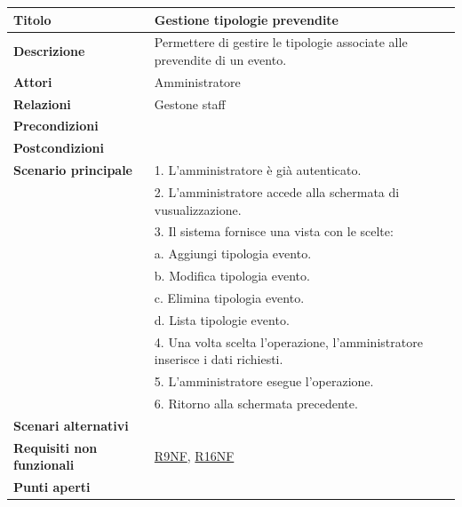 \documentclass[a4paper]{article}
\begin{document}
\begin{center}
\begin{tabularx}{1\textwidth}{|l|X|}
    \hline
	\textbf{Titolo} & Gestione tipologie prevendite \\
	\hline
	\textbf{Descrizione} & Permettere di gestire le tipologie associate alle prevendite di un evento. \\
	\hline
	\textbf{Attori} & Amministratore \\
	\hline
	\textbf{Relazioni} & Gestone staff \\
	\hline
	\textbf{Precondizioni} &  \\
	\hline
	\textbf{Postcondizioni} &  \\
	\hline
	\textbf{Scenario principale} & 1. L'amministratore è già autenticato.\\
	                             & 2. L'amministratore accede alla schermata di vusualizzazione. \\
								 & 3. Il sistema fornisce una vista con le scelte: \\
								 & \quad a. Aggiungi tipologia evento.\\
								 & \quad b. Modifica tipologia evento.\\
								 & \quad c. Elimina tipologia evento.\\
								 & \quad d. Lista tipologie evento.\\
								 & 4. Una volta scelta l'operazione, l'amministratore inserisce i dati richiesti. \\
								 & 5. L'amministratore esegue l'operazione.\\
								 & 6. Ritorno alla schermata precedente.\\
	\hline
	\textbf{Scenari alternativi} & \\
	\hline
	\textbf{Requisiti non funzionali} & \hyperlink{R9NF}{R9NF}, \hyperlink{R16NF}{R16NF} \\
	\hline
	\textbf{Punti aperti} & \\
	\hline
\end{tabularx}
\end{center}

\end{document}
